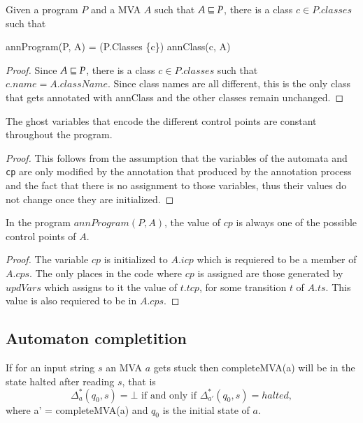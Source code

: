 \documentclass[a4paper,10pt]{article}
\begin{document}
\begin{property}\label{prop:cClass}
Given a program $P$ and a MVA $A$ such that $A \sqsubseteq P$, there is a class $c \in P.classes$ such that
\begin{haskell}
annProgram(P, A) = (P.Classes \setminus \{c\}) \cup annClass(c, A)
\end{haskell}
\begin{proof}
Since $A \sqsubseteq P$, there is a class $c \in P.classes$ such that $c.name = A.className$. Since class names
are all different, this is the only class that gets annotated with \<annClass\> and the other classes remain
unchanged.
\end{proof}
\end{property}

\begin{property}
  The ghost variables that encode the different control points are constant throughout the program.
\begin{proof}
  This follows from the assumption that the variables of the automata and \texttt{cp} are only modified by the
annotation that produced by the annotation process and the fact that there is no assignment to those
variables, thus their values do not change once they are initialized.
\end{proof}
\end{property}

\begin{property}
  In the program $annProgram(P, A)$, the value of $cp$ is always one of the possible control points of $A$.
\begin{proof}
The variable $cp$ is initialized to $A.icp$ which is requiered to be a member of $A.cps$.
The only places in the code where $cp$ is assigned are those generated by $updVars$ which assigns to it
the value of $t.tcp$, for some transition $t$ of $A.ts$. This value is also requiered to be in $A.cps$.
\end{proof}
\end{property}


\subsection{Automaton completition}
\begin{property}
  If for an input string $s$ an MVA $a$ gets stuck then \<completeMVA(a)\> will be in the state \<halted\>
after reading $s$, that is
  $$\Delta^*_a(q_0, s) = \bot \textrm{ if and only if } \Delta^*_{a'}(q_0, s) = halted,$$
where \<a' = completeMVA(a)\> and $q_0$ is the initial state of $a$.
\end{property}
\end{document}
